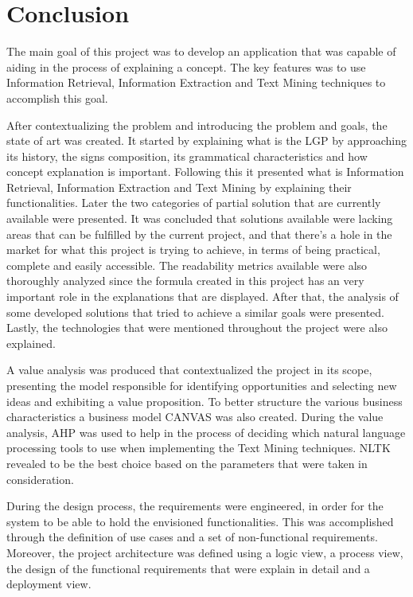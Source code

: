 
\chapter{Conclusion} %
\label{chap:Chapter7}

The main goal of this project was to develop an application that was capable of aiding in the process of explaining a concept.
The key features was to use Information Retrieval, Information Extraction and Text Mining techniques to accomplish this goal.

After contextualizing the problem and introducing the problem and goals, the state of art was created.
It started by explaining what is the \gls{LGP} by approaching its history, the signs composition, its grammatical characteristics and how concept explanation is important.
Following this it presented what is Information Retrieval, Information Extraction and Text Mining by explaining their functionalities.
Later the two categories of partial solution that are currently available were presented.
It was concluded that solutions available were lacking areas that can be fulfilled by the current project, and that there's a hole in the market for what this project is trying to achieve, in terms of being practical, complete and easily accessible.
The readability metrics available were also thoroughly analyzed since the formula created in this project has an very important role in the explanations that are displayed.
After that, the analysis of some developed solutions that tried to achieve a similar goals were presented.
Lastly, the technologies that were mentioned throughout the project were also explained.

A value analysis was produced that contextualized the project in its scope, presenting the model responsible for identifying opportunities and selecting new ideas and exhibiting a value proposition.
To better structure the various business characteristics a business model CANVAS was also created.
During the value analysis, \gls{AHP} was used to help in the process of deciding which natural language processing tools to use when implementing the Text Mining techniques.
NLTK revealed to be the best choice based on the parameters that were taken in consideration.

During the design process, the requirements were engineered, in order for the system to be able to hold the envisioned functionalities.
This was accomplished through the definition of use cases and a set of non-functional requirements.
Moreover, the project architecture was defined using a logic view, a process view, the design of the functional requirements that were explain in detail and a deployment view.

